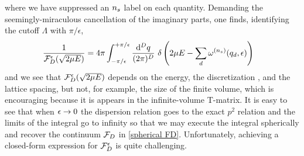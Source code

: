 where we have suppressed an ${n_s}$ label on each quantity.
Demanding the seemingly-miraculous cancellation of the imaginary parts, one finds, identifying the cutoff $\Lambda$ with $\pi/\epsilon$,
\begin{align}
    \frac{1}{\mathcal{F}_D^\epsilon(\sqrt{2\mu E})} &= 4\pi \int_{-\pi/\epsilon}^{+\pi/\epsilon} \frac{\mathrm{d}^D q}{(2\pi)^D}\
    \delta\left(2\mu E - \sum_d \omega^{({n_s})}(q_d,\epsilon)\right)
\end{align}
and we see that $\mathcal{F}_D^\epsilon(\sqrt{2\mu E})$ depends on the energy, the discretization \nstep, and the lattice spacing, but not, for example, the size of the finite volume, which is encouraging because it is appears in the infinite-volume T-matrix.
It is easy to see that when $\epsilon\rightarrow0$ the dispersion relation goes to the exact $p^2$ relation and the limits of the integral go to infinity so that we may execute the integral spherically and recover the continuum $\mathcal{F}_D$ in \eqref{spherical FD}.
Unfortunately, achieving a closed-form expression for $\mathcal{F}_D^\epsilon$ is quite challenging.

